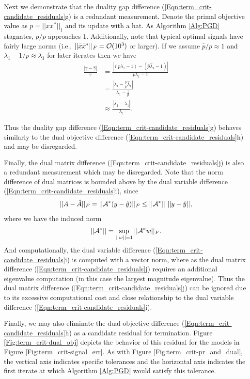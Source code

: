 Next we demonstrate that the duality gap difference (\ref{Eqn:term_crit-candidate_residuals}g) is a redundant measurement.  Denote the primal objective value as $p = ||xx^*||_1$ and its update with a hat.  As Algorithm \ref{Alg:PGD} stagnates, $\hat{p} / p$ approaches $1$. Additionally, note that typical optimal signals have fairly large norms (i.e., $||\bar{x}\bar{x}^*||_F = {\mathcal O}(10^3)$ or larger).  If we assume $\hat{p}/p \approx 1$ and $\lambda_1 -  1/p \approx \lambda_1$ for later iterates then we have
\begin{equation}
\begin{split}
\frac{| \gamma - \hat{\gamma}|}{\gamma}	&	=	\frac{| (p \lambda_1 - 1) - (\hat{p}\hat{\lambda}_1 - 1) |}{p \lambda_1 - 1}
		\\
	&	= \frac{\left| \lambda_1 - \frac{\hat{p}}{p}\hat{\lambda}_1 \right|}{ \lambda_1 - \frac{1}{p} }
		\\
	&	\approx \frac{| \lambda_1 - \hat{\lambda}_1|}{\lambda_1}.
\end{split}
\end{equation}

Thus the duality gap difference (\ref{Eqn:term_crit-candidate_residuals}g) behaves similarly to the dual objective difference (\ref{Eqn:term_crit-candidate_residuals}h) and may be disregarded.  

Finally, the dual matrix difference (\ref{Eqn:term_crit-candidate_residuals}j) is also a redundant measurement which may be disregarded.  Note that the norm difference of dual matrices is bounded above by the dual variable difference (\ref{Eqn:term_crit-candidate_residuals}i), since
\[
||A - \hat{A}||_F = ||{\mathcal A}^*(y - \hat{y})||_F \leq ||{\mathcal A}^*|| \ ||y - \hat{y}||,
\]
where we have the induced norm
\[
||{\mathcal A}^*|| = \sup_{\substack{||w||=1}}||{\mathcal A}^*w||_F.
\]
And computationally, the dual variable difference (\ref{Eqn:term_crit-candidate_residuals}i) is computed with a vector norm, where as the dual matrix difference (\ref{Eqn:term_crit-candidate_residuals}j) requires an additional eigenvalue computation (in this case the largest magnitude eigenvalue).  Thus the dual matrix difference (\ref{Eqn:term_crit-candidate_residuals}j) can be ignored due to its excessive computational cost and close relationship to the dual variable difference (\ref{Eqn:term_crit-candidate_residuals}i).



Finally, we may also eliminate the dual objective difference (\ref{Eqn:term_crit-candidate_residuals}h) as a candidate residual for termination.  Figure \ref{Fig:term_crit-dual_obj} depicts the behavior of this residual for the models in Figure \ref{Fig:term_crit-signal_err}.  As with Figure \ref{Fig:term_crit-pr_and_dual}, the vertical axis indicates specific tolerances and the horizontal axis indicates the first iterate at which Algorithm \ref{Alg:PGD} would satisfy this tolerance.


